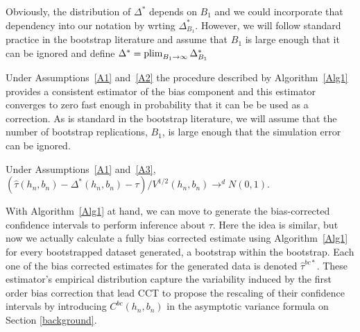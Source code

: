 \documentclass[12pt,fleqn]{article}
\begin{document}
Obviously, the distribution of $\Delta^*$ depends on $B_1$ and we could
incorporate that dependency into our notation by wrting
$\Delta^*_{B_1}$. However, we will follow standard practice in the bootstrap
literature and assume that $B_1$ is large enough that it can be ignored and
define $\Delta^* = \operatorname*{plim}_{B_1 \to \infty} \Delta^*_{B_1}$

Under Assumptions~\ref{A1} and~\ref{A2} the procedure described by
Algorithm~\ref{Alg1} provides a consistent estimator of the bias component and
this estimator converges to zero fast enough in probability that it can be be
used as a correction. As is standard in the bootstrap literature, we will assume
that the number of bootstrap replications, $B_1$, is large enough that the
simulation error can be ignored.

\begin{theorem}\label{T1}
  Under Assumptions~\ref{A1} and~\ref{A3},
  $(\hat\tau(h_n,b_n) - \Delta^*(h_n,b_n) - \tau) / V^{1/2}(h_n, b_n) \to^d N(0,1)$.
\end{theorem}

With Algorithm~\ref{Alg1} at hand, we can move to generate the bias-corrected confidence intervals to perform inference about $\tau$. Here the idea is similar, but now we actually calculate a fully bias corrected estimate using Algorithm~\ref{Alg1} for every bootstrapped dataset generated, a bootstrap within the bootstrap. Each one of the bias corrected estimates for the generated data is denoted $\hat{\tau}^{bc*}$. These estimator's empirical distribution capture the variability induced by the first order bias correction that lead CCT to propose the rescaling of their confidence intervals by introducing $C^{bc}(h_{n},b_{n})$ in the asymptotic variance formula on Section \ref{background}.
\end{document}
